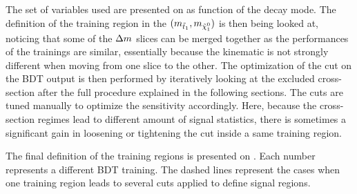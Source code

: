         The set of variables used are presented on  as function of the decay mode. The definition
        of the training region in the $(m_{\tilde{t}_1},m_{\tilde{\chi}_1^0})$ is then being looked at, noticing that some of the
        $\Delta m$ slices can be merged together as the performances of the trainings are similar, essentially because the kinematic
        is not strongly different when moving from one slice to the other. The optimization of the cut on the BDT output is then
        performed by iteratively looking at the excluded cross-section after the full procedure explained in the following sections.
        The cuts are tuned manually to optimize the sensitivity accordingly. Here, because the cross-section regimes lead to
        different amount of signal statistics, there is sometimes a significant gain in loosening or tightening
        the cut inside a same training region.

        The final definition of the training regions is presented on . Each number represents a
        different BDT training. The dashed lines represent the cases when one training region leads to several cuts applied to define
        signal regions.

